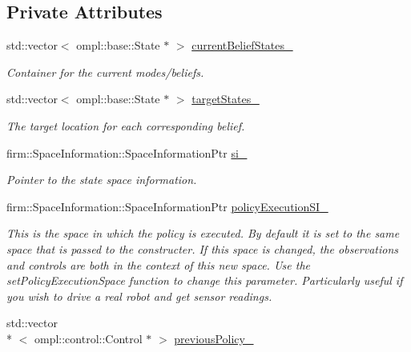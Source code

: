 \subsection*{Private Attributes}
\begin{DoxyCompactItemize}
\item 
\hypertarget{class_n_b_m3_p_ab54a9d284dc22393c47bb904a3980540}{std\-::vector$<$ ompl\-::base\-::\-State $\ast$ $>$ \hyperlink{class_n_b_m3_p_ab54a9d284dc22393c47bb904a3980540}{current\-Belief\-States\-\_\-}}\label{class_n_b_m3_p_ab54a9d284dc22393c47bb904a3980540}

\begin{DoxyCompactList}\small\item\em Container for the current modes/beliefs. \end{DoxyCompactList}\item 
\hypertarget{class_n_b_m3_p_a1e44c4aab83bddb3f19e709079da8a14}{std\-::vector$<$ ompl\-::base\-::\-State $\ast$ $>$ \hyperlink{class_n_b_m3_p_a1e44c4aab83bddb3f19e709079da8a14}{target\-States\-\_\-}}\label{class_n_b_m3_p_a1e44c4aab83bddb3f19e709079da8a14}

\begin{DoxyCompactList}\small\item\em The target location for each corresponding belief. \end{DoxyCompactList}\item 
\hypertarget{class_n_b_m3_p_a4c6505f2dd7bb3dbf7b1a26ca2bf07dc}{firm\-::\-Space\-Information\-::\-Space\-Information\-Ptr \hyperlink{class_n_b_m3_p_a4c6505f2dd7bb3dbf7b1a26ca2bf07dc}{si\-\_\-}}\label{class_n_b_m3_p_a4c6505f2dd7bb3dbf7b1a26ca2bf07dc}

\begin{DoxyCompactList}\small\item\em Pointer to the state space information. \end{DoxyCompactList}\item 
\hypertarget{class_n_b_m3_p_a9d4ddb656f5f8ec781bd07771f18e83f}{firm\-::\-Space\-Information\-::\-Space\-Information\-Ptr \hyperlink{class_n_b_m3_p_a9d4ddb656f5f8ec781bd07771f18e83f}{policy\-Execution\-S\-I\-\_\-}}\label{class_n_b_m3_p_a9d4ddb656f5f8ec781bd07771f18e83f}

\begin{DoxyCompactList}\small\item\em This is the space in which the policy is executed. By default it is set to the same space that is passed to the constructer. If this space is changed, the observations and controls are both in the context of this new space. Use the set\-Policy\-Execution\-Space function to change this parameter. Particularly useful if you wish to drive a real robot and get sensor readings. \end{DoxyCompactList}\item 
\hypertarget{class_n_b_m3_p_a8303a635a8a127056e48928b721d1269}{std\-::vector\\*
$<$ ompl\-::control\-::\-Control $\ast$ $>$ \hyperlink{class_n_b_m3_p_a8303a635a8a127056e48928b721d1269}{previous\-Policy\-\_\-}}\label{class_n_b_m3_p_a8303a635a8a127056e48928b721d1269}


\end{DoxyCompactItemize}
